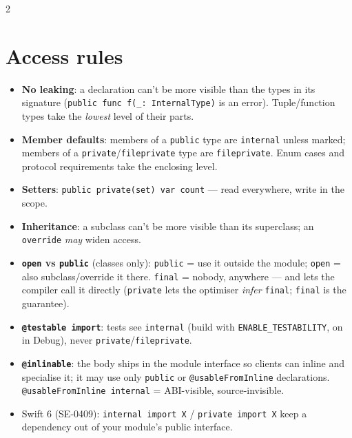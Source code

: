 \documentclass[8pt]{extarticle}
\begin{document}
\begin{multicols}{2}
\section{Access rules}
\begin{itemize}
  \item \textbf{No leaking}: a declaration can't be more visible than the types in its signature
        (\texttt{public func f(\_: InternalType)} is an error). Tuple/function types take the
        \emph{lowest} level of their parts.
  \item \textbf{Member defaults}: members of a \texttt{public} type are \texttt{internal} unless
        marked; members of a \texttt{private}/\texttt{fileprivate} type are \texttt{fileprivate}.
        Enum cases and protocol requirements take the enclosing level.
  \item \textbf{Setters}: \texttt{public private(set) var count} — read everywhere, write in the scope.
  \item \textbf{Inheritance}: a subclass can't be more visible than its superclass; an
        \texttt{override} \emph{may} widen access.
  \item \textbf{\texttt{open} vs \texttt{public}} (classes only): \texttt{public} = use it outside
        the module; \texttt{open} = also subclass/override it there. \texttt{final} = nobody,
        anywhere — and lets the compiler call it directly (\texttt{private} lets the optimiser
        \emph{infer} \texttt{final}; \texttt{final} is the guarantee).
  \item \textbf{\texttt{@testable import}}: tests see \texttt{internal} (build with
        \texttt{ENABLE\_TESTABILITY}, on in Debug), never \texttt{private}/\texttt{fileprivate}.
  \item \textbf{\texttt{@inlinable}}: the body ships in the module interface so clients can inline
        and specialise it; it may use only \texttt{public} or \texttt{@usableFromInline}
        declarations. \texttt{@usableFromInline internal} = ABI-visible, source-invisible.
  \item Swift 6 (SE-0409): \texttt{internal import X} / \texttt{private import X} keep a dependency
        out of your module's public interface.
\end{itemize}

\columnbreak


\end{multicols}
\end{document}
